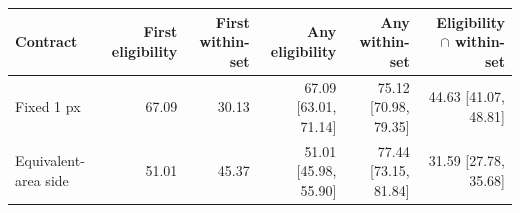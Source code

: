 \begin{tabular}{@{}lrrrrr@{}}
\toprule
Contract & First eligibility & First within-set & Any eligibility & Any within-set & Eligibility $\cap$ within-set \\
\midrule
Fixed 1 px & 67.09 & 30.13 & 67.09 [63.01, 71.14] & 75.12 [70.98, 79.35] & 44.63 [41.07, 48.81] \\
Equivalent-area side & 51.01 & 45.37 & 51.01 [45.98, 55.90] & 77.44 [73.15, 81.84] & 31.59 [27.78, 35.68] \\
\bottomrule
\end{tabular}
